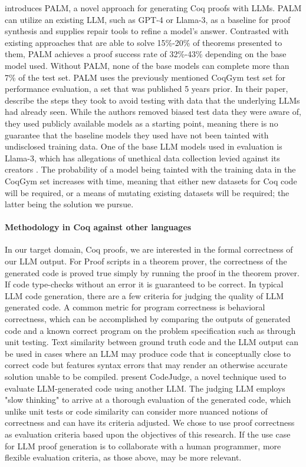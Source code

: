\citep{proofautomationwithllms} introduces PALM,
a novel approach for generating Coq proofs with LLMs.
PALM can utilize an existing LLM, such as GPT-4 or Llama-3,
as a baseline for proof synthesis and supplies repair tools
to refine a model's answer.
Contrasted with existing approaches that are able
to solve 15\%-20\% of theorems presented to them,
PALM achieves a proof success rate of 32\%-43\% 
depending on the base model used.
Without PALM, none of the base models can
complete more than 7\% of the test set.
PALM uses the previously mentioned CoqGym test set
for performance evaluation, 
a set that was published 5 years prior. 
In their paper, \citeauthor{proofautomationwithllms} describe the steps 
they took to avoid testing with data 
that the underlying LLMs had already seen.  
While the authors removed biased test data they were aware of, 
they used publicly available models as a starting point, 
meaning there is no guarantee that the baseline models 
they used have not been tainted with undisclosed training data. 
One of the base LLM models used in evaluation is Llama-3, 
which has allegations of unethical data collection 
levied against its creators \cite{PierceSF:LF2024}. 
The probability of a model being tainted 
with the training data in the CoqGym set increases with time, 
meaning that either new datasets for Coq code will be required, 
or a means of mutating existing datasets will be required; 
the latter being the solution we pursue.



\paragraph{Methodology in Coq against other languages}
In our target domain, Coq proofs, 
we are interested in the formal correctness of our LLM output.
For Proof scripts in a theorem prover,
the correctness of the generated code is proved true
simply by running the proof in the theorem prover.
If code type-checks without an error it is guaranteed to be correct.
In typical LLM code generation,
there are a few criteria for judging the quality of LLM generated code.  
A common metric for program correctness is behavioral correctness,
which can be accomplished by comparing the outputs of generated code
and a known correct program on the problem specification such as through unit testing.
Text similarity between ground truth code and the LLM output can be used
in cases where an LLM may produce code that is conceptually close
to correct code but features syntax errors that may render an
otherwise accurate solution unable to be compiled.
\citet{CodeJudge} present CodeJudge, a novel technique
used to evaluate LLM-generated code using another LLM.
The judging LLM employs "slow thinking" to arrive at a
thorough evaluation of the generated code,
which unlike unit tests or code similarity can consider
more nuanced notions of correctness and can have its
criteria adjusted.
We chose to use proof correctness as evaluation criteria
based upon the objectives of this research.
If the use case for LLM proof generation is to
collaborate with a human programmer,
more flexible evaluation criteria, as those above, may be more relevant. 

